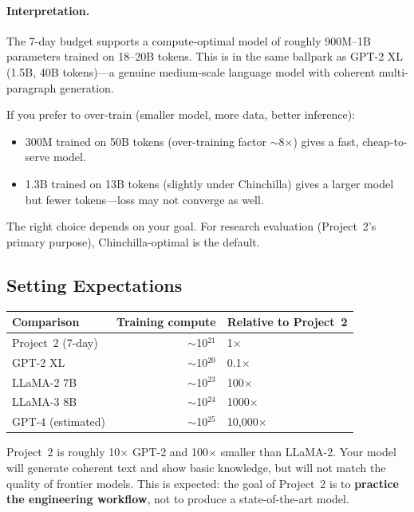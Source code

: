 \paragraph{Interpretation.} The 7-day budget supports a compute-optimal model of roughly 900M--1B parameters trained on 18--20B tokens. This is in the same ballpark as GPT-2 XL (1.5B, 40B tokens)---a genuine medium-scale language model with coherent multi-paragraph generation.

If you prefer to over-train (smaller model, more data, better inference):
\begin{itemize}[nosep]
  \item 300M trained on 50B tokens (over-training factor $\sim$8$\times$) gives a fast, cheap-to-serve model.
  \item 1.3B trained on 13B tokens (slightly under Chinchilla) gives a larger model but fewer tokens---loss may not converge as well.
\end{itemize}

The right choice depends on your goal. For research evaluation (Project~2's primary purpose), Chinchilla-optimal is the default.


\subsection{Setting Expectations}
\label{sec:expectations}

\begin{center}
\begin{tabular}{lrl}
\toprule
\textbf{Comparison} & \textbf{Training compute} & \textbf{Relative to Project~2} \\
\midrule
Project~2 (7-day) & $\sim$10$^{21}$ & 1$\times$ \\
GPT-2 XL & $\sim$10$^{20}$ & 0.1$\times$ \\
LLaMA-2 7B & $\sim$10$^{23}$ & 100$\times$ \\
LLaMA-3 8B & $\sim$10$^{24}$ & 1000$\times$ \\
GPT-4 (estimated) & $\sim$10$^{25}$ & 10,000$\times$ \\
\bottomrule
\end{tabular}
\end{center}

Project~2 is roughly 10$\times$ GPT-2 and 100$\times$ smaller than LLaMA-2. Your model will generate coherent text and show basic knowledge, but will not match the quality of frontier models. This is expected: the goal of Project~2 is to \textbf{practice the engineering workflow}, not to produce a state-of-the-art model.

